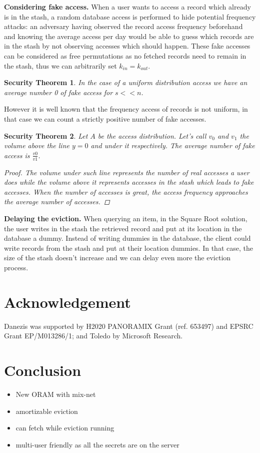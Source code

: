 \documentclass{llncs}
\newtheorem{secthm}{Security Theorem}
\begin{document}
\noindent\textbf{Considering fake access.} When a user wants to access a record which already is in the stash, a random database access is performed to hide potential frequency attacks: an adversary having observed the record access frequency beforehand and knowing the average access per day would be able to guess which records are in the stash by not observing accesses which should happen.
These fake accesses can be considered as free permutations as no fetched records need to remain in the stash, thus we can arbitrarily set $k_{in}=k_{out}$.
%
\begin{secthm}
In the case of a uniform distribution access we have an average number 0 of fake access for $s<<n$.
\end{secthm}
%
However it is well known that the frequency access of records is not uniform, in that case we can count a strictly positive number of fake accesses.
\begin{secthm}
Let $A$ be the access distribution. Let's call $v_0$ and $v_1$ the volume above the line $y=0$ and under it respectively.
The average number of fake access is $ \frac{v0}{v1}$.
\begin{proof}
 The volume under such line represents the number of real accesses a user does while the volume above it represents accesses in the stash which leads to fake accesses.
 When the number of accesses is great, the access frequency approaches the average number of accesses.
\end{proof}
\end{secthm}

\noindent\textbf{Delaying the eviction.} When querying an item, in the Square Root solution, the user writes in the stash the retrieved record and put at its location in the database a dummy. Instead of writing dummies in the database, the client could write records from the stash and put at their location dummies. In that case, the size of the stash doesn't increase and we can delay even more the eviction process.


\section{Acknowledgement}
Danezis was supported by H2020  PANORAMIX Grant (ref. 653497) and EPSRC Grant EP/M013286/1; and Toledo by Microsoft Research.


\section{Conclusion}\label{Conclusion}
\begin{itemize}
 \item New ORAM with mix-net
 \item amortizable eviction
 \item can fetch while eviction running
 \item multi-user friendly as all the secrets are on the server
\end{itemize}
\end{document}
